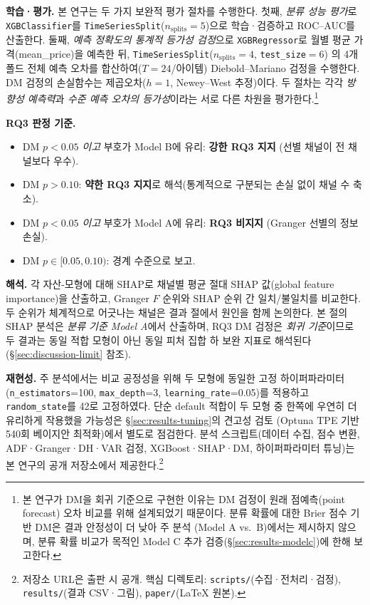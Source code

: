 \documentclass[11pt, a4paper, twocolumn]{article}
\begin{document}
\textbf{학습·평가.} 본 연구는 두 가지 보완적 평가 절차를 수행한다.
첫째, \emph{분류 성능 평가}로 \texttt{XGBClassifier}\citep{chenguestrin2016}를
\texttt{TimeSeriesSplit}($n_{\text{splits}}=5$)으로 학습·검증하고
ROC--AUC를 산출한다. 둘째, \emph{예측 정확도의 통계적 등가성 검정}으로
\texttt{XGBRegressor}로 월별 평균 가격(\textsf{mean\_price})을 예측한 뒤,
\texttt{TimeSeriesSplit}($n_{\text{splits}}=4$, \texttt{test\_size}$=6$)
의 4개 폴드 전체 예측 오차를 합산하여($T=24$/아이템) Diebold--Mariano
검정\citep{dieboldmariano1995}을 수행한다. DM 검정의 손실함수는
제곱오차($h=1$, Newey--West 추정)이다. 두 절차는 각각 \emph{방향성
예측력}과 \emph{수준 예측 오차의 등가성}이라는 서로 다른 차원을
평가한다.\footnote{본 연구가 DM을 회귀 기준으로 구현한 이유는 DM 검정이
원래 점예측(point forecast) 오차 비교를 위해 설계되었기 때문이다.
분류 확률에 대한 Brier 점수 기반 DM은 결과 안정성이 더 낮아 주 분석
(Model A vs.\ B)에서는 제시하지 않으며, 분류 확률 비교가 목적인
Model C 추가 검증(\S\ref{sec:results-modelc})에 한해 보고한다.}

\textbf{RQ3 판정 기준.}
\begin{itemize}[leftmargin=1.4em, topsep=0pt, itemsep=0pt]
  \item DM $p < 0.05$ \emph{이고} 부호가 Model B에 유리: \textbf{강한 RQ3 지지}
        (선별 채널이 전 채널보다 우수).
  \item DM $p > 0.10$: \textbf{약한 RQ3 지지}로 해석(통계적으로 구분되는
        손실 없이 채널 수 축소).
  \item DM $p < 0.05$ \emph{이고} 부호가 Model A에 유리: \textbf{RQ3 비지지}
        (Granger 선별의 정보 손실).
  \item DM $p \in [0.05, 0.10)$: 경계 수준으로 보고.
\end{itemize}

\textbf{해석.} 각 자산-모형에 대해 SHAP\citep{lundberglee2017}로
채널별 평균 절대 SHAP 값(global feature importance)을 산출하고,
Granger $F$ 순위와 SHAP 순위 간 일치/불일치를 비교한다. 두 순위가
체계적으로 어긋나는 채널은 결과 절에서 원인을 함께 논의한다. 본 절의
SHAP 분석은 \emph{분류 기준 Model A}에서 산출하며, RQ3 DM 검정은
\emph{회귀 기준}이므로 두 결과는 동일 적합 모형이 아닌 동일 피처 집합
하 보완 지표로 해석된다(\S\ref{sec:discussion-limit} 참조).

\textbf{재현성.} 주 분석에서는 비교 공정성을 위해 두 모형에 동일한
고정 하이퍼파라미터(\texttt{n\_estimators}=100, \texttt{max\_depth}=3,
\texttt{learning\_rate}=0.05)를 적용하고 \texttt{random\_state}를
42로 고정하였다. 단순 default 적합이 두 모형 중 한쪽에 우연히 더
유리하게 작용했을 가능성은 \S\ref{sec:results-tuning}의 견고성 검토
(Optuna TPE 기반 540회 베이지안 최적화)에서 별도로 점검한다. 분석
스크립트(데이터 수집, 점수 변환, ADF·Granger·DH·VAR 검정, XGBoost·SHAP·DM,
하이퍼파라미터 튜닝)는 본 연구의 공개 저장소에서 제공한다.\footnote{저장소
URL은 출판 시 공개. 핵심 디렉토리: \texttt{scripts/}(수집·전처리·검정),
\texttt{results/}(결과 CSV·그림), \texttt{paper/}(LaTeX 원본).}
\end{document}
